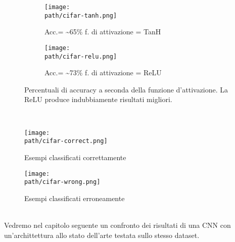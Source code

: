 \bigskip

\begin{figure}
\centering
\begin{subfigure}{.5\textwidth}
  \centering
 \texttt{[image: \\path/cifar-tanh.png]} 
  \caption{Acc.= \textasciitilde 65\% f. di attivazione = TanH}
 \label{fig:training}
\end{subfigure}%
\begin{subfigure}{.5\textwidth}
  \centering
 \texttt{[image: \\path/cifar-relu.png]} 
  \caption{Acc.= \textasciitilde 73\% f. di attivazione = ReLU}
 \label{fig:validation}
\end{subfigure}
\caption{Percentuali di accuracy a seconda della funzione d'attivazione. La ReLU produce indubbiamente risultati migliori.}
\label{fig:relu}
\end{figure}
\\
\newpage
\pagebreak
\medskip
\newpage

\begin{figure}[h!]
 \centering
 \texttt{[image: \\path/cifar-correct.png]} 
 \caption{Esempi classificati correttamente}
 \label{fig:cifar-correct}
\end{figure}

\begin{figure}[h!]
 \centering
 \texttt{[image: \\path/cifar-wrong.png]} 
 \caption{Esempi classificati erroneamente}
 \label{fig:cifar-wrong}
\end{figure}
\\
Vedremo nel capitolo seguente un confronto dei risultati di una CNN con un'archittettura allo stato dell'arte testata sullo stesso dataset. 